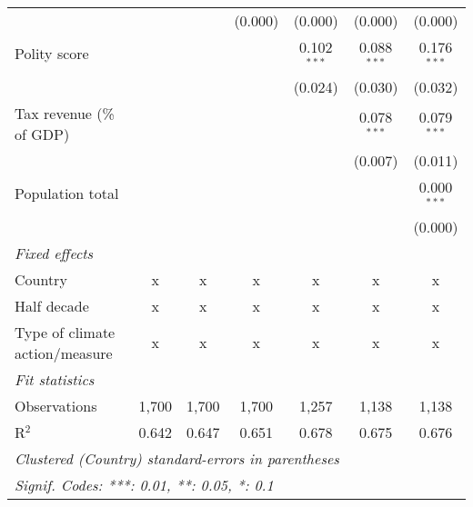 \begin{tabular}{lcccccc}
                                                                            &         &                & (0.000)        & (0.000)        & (0.000)        & (0.000)\\   
   Polity score                                                             &         &                &                & 0.102$^{***}$  & 0.088$^{***}$  & 0.176$^{***}$\\   
                                                                            &         &                &                & (0.024)        & (0.030)        & (0.032)\\   
   Tax revenue (\% of GDP)                                                  &         &                &                &                & 0.078$^{***}$  & 0.079$^{***}$\\   
                                                                            &         &                &                &                & (0.007)        & (0.011)\\   
   Population total                                                         &         &                &                &                &                & 0.000$^{***}$\\   
                                                                            &         &                &                &                &                & (0.000)\\   
   \emph{Fixed effects}\\
   Country                                                                  & x       & x              & x              & x              & x              & x\\  
   Half decade                                                              & x       & x              & x              & x              & x              & x\\  
   Type of climate action/measure                                           & x       & x              & x              & x              & x              & x\\  
   \midrule \emph{Fit statistics}\\
   Observations                                                             & 1,700   & 1,700          & 1,700          & 1,257          & 1,138          & 1,138\\  
   R$^2$                                                                    & 0.642   & 0.647          & 0.651          & 0.678          & 0.675          & 0.676\\  
   \midrule
   \multicolumn{7}{l}{\emph{Clustered (Country) standard-errors in parentheses}}\\
   \multicolumn{7}{l}{\emph{Signif. Codes: ***: 0.01, **: 0.05, *: 0.1}}\\
\end{tabular}
\par\endgroup


